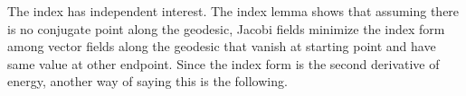 The index has independent interest. The index lemma shows that assuming there is no conjugate point along the geodesic, Jacobi fields minimize the index form among vector fields along the geodesic that vanish at starting point and have same value at other endpoint. Since the index form is the second derivative of energy, another way of saying this is the following.\\

